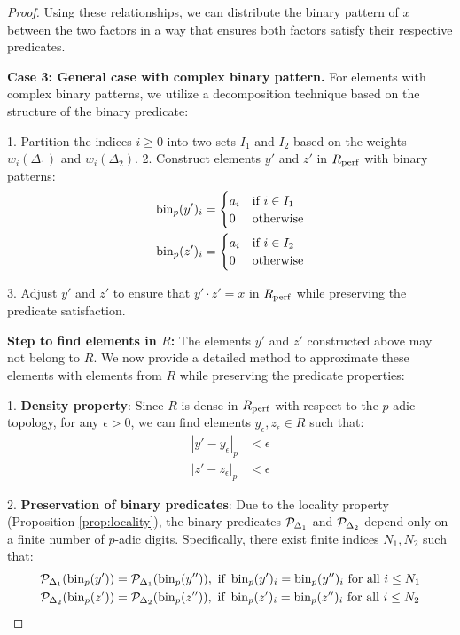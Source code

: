 \begin{proof}
Using these relationships, we can distribute the binary pattern of $x$ between the two factors in a way that ensures both factors satisfy their respective predicates.

\textbf{Case 3: General case with complex binary pattern.} For elements with complex binary patterns, we utilize a decomposition technique based on the structure of the binary predicate:

1. Partition the indices $i \geq 0$ into two sets $I_1$ and $I_2$ based on the weights $w_i(\Delta_1)$ and $w_i(\Delta_2)$.
2. Construct elements $y'$ and $z'$ in $R_{\operatorname{perf}}$ with binary patterns:
\begin{align*}
\operatorname{bin}_p(y')_i &= \begin{cases}
a_i & \text{if } i \in I_1 \\
0 & \text{otherwise}
\end{cases} \\
\operatorname{bin}_p(z')_i &= \begin{cases}
a_i & \text{if } i \in I_2 \\
0 & \text{otherwise}
\end{cases}
\end{align*}

3. Adjust $y'$ and $z'$ to ensure that $y' \cdot z' = x$ in $R_{\operatorname{perf}}$ while preserving the predicate satisfaction.

\textbf{Step to find elements in $R$:} The elements $y'$ and $z'$ constructed above may not belong to $R$. We now provide a detailed method to approximate these elements with elements from $R$ while preserving the predicate properties:

1. \textbf{Density property}: Since $R$ is dense in $R_{\operatorname{perf}}$ with respect to the $p$-adic topology, for any $\epsilon > 0$, we can find elements $y_{\epsilon}, z_{\epsilon} \in R$ such that:
   \begin{align*}
   |y' - y_{\epsilon}|_p &< \epsilon \\
   |z' - z_{\epsilon}|_p &< \epsilon
   \end{align*}

2. \textbf{Preservation of binary predicates}: Due to the locality property (Proposition \ref{prop:locality}), the binary predicates $\mathcal{P}_{\Delta_1}$ and $\mathcal{P}_{\Delta_2}$ depend only on a finite number of $p$-adic digits. Specifically, there exist finite indices $N_1, N_2$ such that:
   \begin{align*}
   \mathcal{P}_{\Delta_1}(\operatorname{bin}_p(y')) &= \mathcal{P}_{\Delta_1}(\operatorname{bin}_p(y'')), \text{ if } \operatorname{bin}_p(y')_i = \operatorname{bin}_p(y'')_i \text{ for all } i \leq N_1 \\
   \mathcal{P}_{\Delta_2}(\operatorname{bin}_p(z')) &= \mathcal{P}_{\Delta_2}(\operatorname{bin}_p(z'')), \text{ if } \operatorname{bin}_p(z')_i = \operatorname{bin}_p(z'')_i \text{ for all } i \leq N_2
   \end{align*}


\end{proof}

